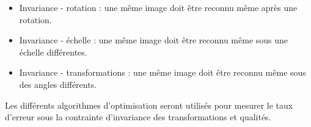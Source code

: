 \documentclass[11pt,a4paper]{report}
\begin{document}
	 
	\begin{itemize}
		\item Invariance - rotation : une même image doit être reconnu même après une rotation.
		\item Invariance - échelle : une même image doit être reconnu même sous une échelle différentes.
		\item Invariance - transformations : une même image doit être reconnu même sous des angles différents.
	\end{itemize}
	Les différents algorithmes d'optimisation seront utilisés pour mesurer le taux d’erreur sous la contrainte d'invariance des transformations et qualités. 
	
	

	
		
	
	
	

	
		
	
	
	
	\pagebreak
	
	
	
	
	
	
	
	
	
	
	
	
	
	 
	
	\nocite{*}
	
	
	
	
	
	
	
	
\end{document}
